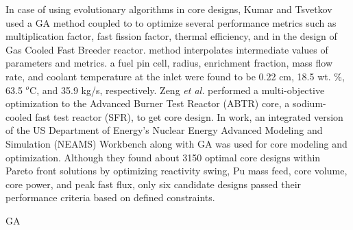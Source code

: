     In \DIFaddbegin {}\DIFaddend case of using evolutionary algorithms in core designs, Kumar and Tsvetkov \cite{Kumar2015} used a \DIFdelbegin {}\DIFdelend \DIFaddbegin \gls{GA} \DIFaddend method coupled to \DIFdelbegin {}\DIFdelend \DIFaddbegin {}\DIFaddend to optimize several performance metrics such as multiplication factor, fast fission factor, thermal efficiency, and \DIFdelbegin {}\DIFdelend \DIFaddbegin {}\DIFaddend in the design of \DIFdelbegin {}\DIFdelend Gas Cooled Fast Breeder reactor. \DIFdelbegin {}\DIFdelend \DIFaddbegin {}\DIFaddend method interpolates intermediate values of \DIFdelbegin {}\DIFdelend parameters and metrics. \DIFdelbegin {}\DIFdelend \DIFaddbegin {}\DIFaddend a fuel pin cell, \DIFdelbegin {}\DIFdelend \DIFaddbegin {}\DIFaddend radius, enrichment fraction, mass flow rate, and coolant temperature at the inlet were found to be 0.22 cm, 18.5 wt. \%, 63.5  $^o$C, and 35.9 kg/s, respectively. Zeng \emph{et al.} \cite{Zeng2020} performed a multi-objective optimization to the Advanced Burner Test Reactor (ABTR) core, a sodium-cooled fast test reactor (SFR), to get \DIFdelbegin {}\DIFdelend \DIFaddbegin {}\DIFaddend core design. In \DIFdelbegin {}\DIFdelend \DIFaddbegin {}\DIFaddend work, an integrated version of the US Department of Energy's Nuclear Energy Advanced Modeling and Simulation (NEAMS) Workbench \cite{neams2019} along with \gls{GA} was used for core modeling and optimization. Although they found about 3150 optimal core designs within Pareto front solutions by optimizing \DIFdelbegin {}\DIFdelend reactivity swing, Pu mass feed, core volume, core power, and peak fast flux, only six candidate designs passed their performance criteria based on \DIFdelbegin {}\DIFdelend \DIFaddbegin {}\DIFaddend defined constraints.

    \DIFaddbegin {}\gls{GA} 

